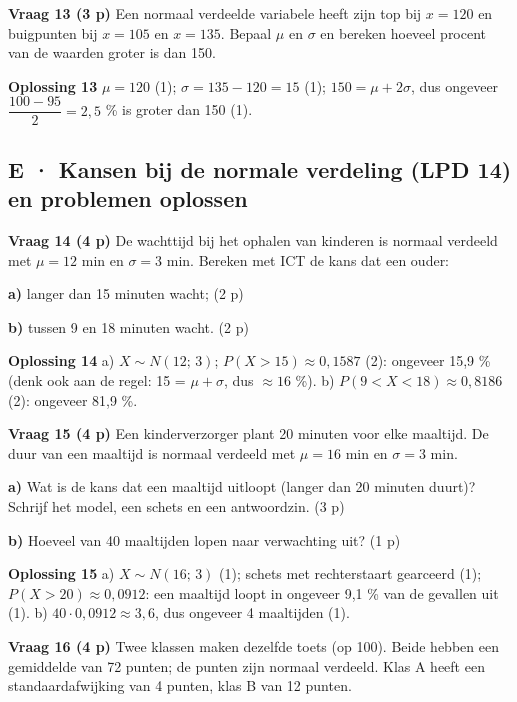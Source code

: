 \textbf{Vraag 13 \quad (3 p)} Een normaal verdeelde variabele heeft zijn top bij $x=120$ en buigpunten bij $x=105$ en $x=135$. Bepaal $\mu$ en $\sigma$ en bereken hoeveel procent van de waarden groter is dan 150. \lijn

\begin{oplossing}
\textbf{Oplossing 13} \quad $\mu=120$ (1); $\sigma=135-120=15$ (1); $150=\mu+2\sigma$, dus ongeveer $\dfrac{100-95}{2}=2{,}5$ \% is groter dan 150 (1).
\end{oplossing}

\subsection*{E · Kansen bij de normale verdeling (LPD 14) en problemen oplossen}

\textbf{Vraag 14 \quad (4 p)} De wachttijd bij het ophalen van kinderen is normaal verdeeld met $\mu=12$ min en $\sigma=3$ min. Bereken met ICT de kans dat een ouder:

\textbf{a)} langer dan 15 minuten wacht; (2 p) \lijn

\textbf{b)} tussen 9 en 18 minuten wacht. (2 p) \lijn

\begin{oplossing}
\textbf{Oplossing 14} \quad a) $X\sim N(12;\,3)$; $P(X>15)\approx 0{,}1587$ (2): ongeveer 15,9 \% (denk ook aan de regel: 15 = $\mu+\sigma$, dus $\approx 16$ \%). b) $P(9<X<18)\approx 0{,}8186$ (2): ongeveer 81,9 \%.
\end{oplossing}

\textbf{Vraag 15 \quad (4 p)} Een kinderverzorger plant 20 minuten voor elke maaltijd. De duur van een maaltijd is normaal verdeeld met $\mu=16$ min en $\sigma=3$ min.

\textbf{a)} Wat is de kans dat een maaltijd uitloopt (langer dan 20 minuten duurt)? Schrijf het model, een schets en een antwoordzin. (3 p) \lijn

\textbf{b)} Hoeveel van 40 maaltijden lopen naar verwachting uit? (1 p) \lijn

\begin{oplossing}
\textbf{Oplossing 15} \quad a) $X\sim N(16;\,3)$ (1); schets met rechterstaart gearceerd (1); $P(X>20)\approx 0{,}0912$: een maaltijd loopt in ongeveer 9,1 \% van de gevallen uit (1). b) $40\cdot 0{,}0912\approx 3{,}6$, dus ongeveer 4 maaltijden (1).
\end{oplossing}

\textbf{Vraag 16 \quad (4 p)} Twee klassen maken dezelfde toets (op 100). Beide hebben een gemiddelde van 72 punten; de punten zijn normaal verdeeld. Klas A heeft een standaardafwijking van 4 punten, klas B van 12 punten.

